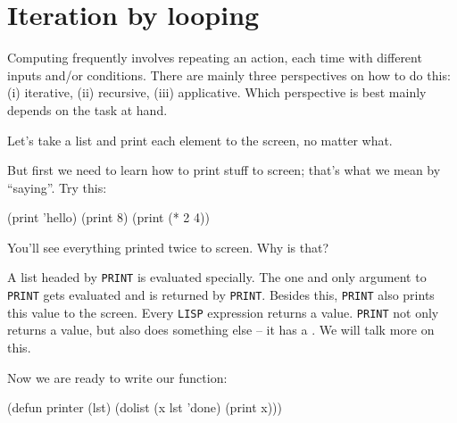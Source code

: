 \documentclass[a4paper,11pt]{article}
\begin{document}
% 
% 

\section{Iteration by looping}

\begin{uenum}
\item Computing frequently involves repeating an action, each time with different inputs and/or conditions. There are mainly three perspectives on how to do this: (i) iterative, (ii) recursive, (iii) applicative. Which perspective is best mainly depends on the task at hand.

\item Let's take a list and print each element to the screen, no matter what. 

\item But first we need to learn how to print stuff to screen; that's what we mean by ``saying''. Try this: 

\begin{lispcode}
(print 'hello)
(print 8)
(print (* 2 4))
\end{lispcode}

\begin{uenumi}

\item You'll see everything printed twice to screen. Why is that?

\item A list headed by \Verb+PRINT+ is evaluated specially. The one and only argument to \Verb+PRINT+ gets evaluated and is returned by \Verb+PRINT+. Besides this, \Verb+PRINT+ also prints this value to the screen. Every \Verb+LISP+ expression returns a value. \Verb+PRINT+ not only returns a value, but also does something else -- it has a . We will talk more on this. 
\end{uenumi}

\item Now we are ready to write our function:

\begin{lispcode}
(defun printer (lst)
  (dolist (x lst 'done)
	(print x)))
\end{lispcode}


\end{uenum}
\end{document}
